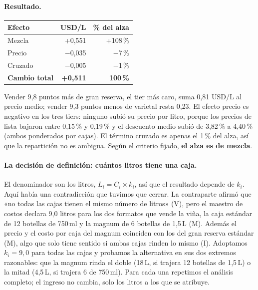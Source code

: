 \paragraph{Resultado.}

\begin{center}
\small
\begin{tabular}{l r r}
\hline
\textbf{Efecto} & \textbf{USD/L} & \textbf{\% del alza} \\
\hline
Mezcla & +0,551 & +108\,\% \\
Precio & $-$0,035 & $-$7\,\% \\
Cruzado & $-$0,005 & $-$1\,\% \\
\hline
\textbf{Cambio total} & \textbf{+0,511} & \textbf{100\,\%} \\
\hline
\end{tabular}
\end{center}

\noindent Vender 9,8 puntos más de gran reserva, el tier más caro, suma 0,81 USD/L al precio medio; vender 9,3 puntos menos de varietal resta 0,23. El efecto precio es negativo en los tres tiers: ninguno subió su precio por litro, porque los precios de lista bajaron entre 0,15\,\% y 0,19\,\% y el descuento medio subió de 3,82\,\% a 4,40\,\% (ambos ponderados por cajas). El término cruzado es apenas el 1\,\% del alza, así que la repartición no es ambigua. Según el criterio fijado, \textbf{el alza es de mezcla}.

\paragraph{La decisión de definición: cuántos litros tiene una caja.} El denominador son los litros, $L_i = C_i \times k_i$, así que el resultado depende de $k_i$. Aquí había una contradicción que tuvimos que cerrar. La contraparte afirmó que «no todas las cajas tienen el mismo número de litros» (V), pero el maestro de costos declara 9,0 litros para los dos formatos que vende la viña, la caja estándar de 12 botellas de 750\,ml y la magnum de 6 botellas de 1,5\,L (M). Además el precio y el costo por caja del magnum coinciden con los del gran reserva estándar (M), algo que solo tiene sentido si ambas cajas rinden lo mismo (I). Adoptamos $k_i = 9{,}0$ para todas las cajas y probamos la alternativa en sus dos extremos razonables: que la magnum rinda el doble (18\,L, si trajera 12 botellas de 1,5\,L) o la mitad (4,5\,L, si trajera 6 de 750\,ml). Para cada una repetimos el análisis completo; el ingreso no cambia, solo los litros a los que se atribuye.

